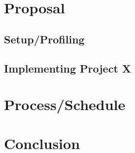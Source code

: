 \documentclass{article}
\begin{document}

\section*{Proposal}

\subsection*{Setup/Profiling}


\subsection*{Implementing Project X}



\section*{Process/Schedule}

\section*{Conclusion}




\end{document}
